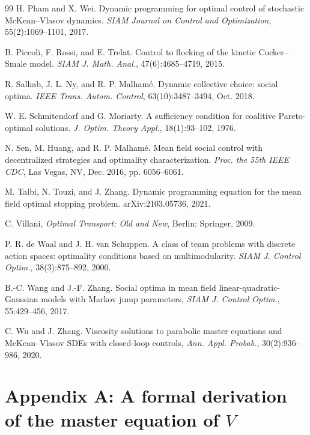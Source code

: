 \documentclass{amsart}
\theoremstyle{definition}
\theoremstyle{remark}
\numberwithin{equation}{section}
\begin{document}
\begin{thebibliography}{99}
H. Pham and X. Wei. Dynamic programming for optimal control of stochastic McKean--Vlasov dynamics.
{\it SIAM Journal on Control and Optimization}, 55(2):1069--1101, 2017.


B. Piccoli, F. Rossi, and E. Trelat.
Control to flocking of the kinetic Cucker--Smale model.
{\it SIAM J. Math. Anal.}, 47(6):4685--4719, 2015.


R. Salhab, J. L. Ny, and R. P. Malham\'e. Dynamic collective choice: social optima. {\it IEEE Trans. Autom.
Control}, 63(10):3487--3494, Oct. 2018.

W. E. Schmitendorf and G. Moriarty. A sufficiency condition for coalitive Pareto-optimal solutions.
{\it J. Optim. Theory  Appl.}, 18(1):93--102,   1976.

N. Sen, M. Huang, and R. P. Malham\'e. Mean field social control with decentralized strategies and optimality characterization. {\it Proc. the 55th IEEE CDC}, Las Vegas, NV, Dec. 2016, pp. 6056--6061.




M. Talbi, N. Touzi, and J. Zhang. Dynamic programming equation for the mean field optimal stopping
problem. arXiv:2103.05736, 2021.



C. Villani, {\it Optimal Transport: Old and New}, Berlin: Springer, 2009.


P. R. de Waal and J. H. van Schuppen. A class of team problems with
discrete action spaces: optimality conditions based on
multimodularity. {\it SIAM J. Control Optim.},  38(3):875--892, 2000.


B.-C. Wang and J.-F. Zhang.
Social optima in mean field linear-quadratic-Gaussian models with Markov jump parameters,
{\it SIAM J. Control Optim.}, 55:429--456, 2017.




C. Wu and J. Zhang.
Viscosity solutions to parabolic master equations and
McKean--Vlasov SDEs with closed-loop controls,
{\it Ann. Appl. Probab.}, 30(2):936--986, 2020.






\end{thebibliography}





\section*{Appendix A: A formal derivation of the master  equation of $V$}
\end{document}
